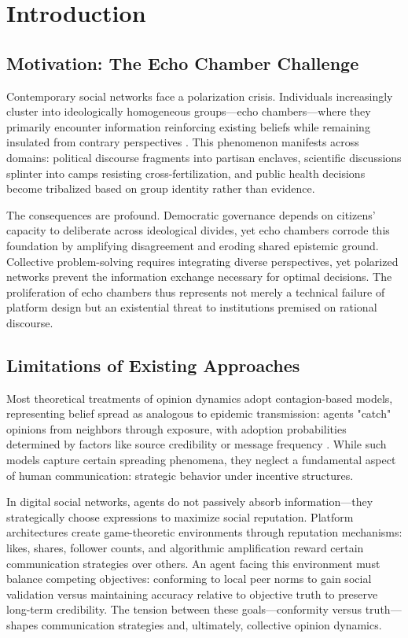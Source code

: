 \documentclass[11pt,a4paper]{article}
\begin{document}
\section{Introduction}

\subsection{Motivation: The Echo Chamber Challenge}

Contemporary social networks face a polarization crisis. Individuals increasingly cluster into ideologically homogeneous groups—echo chambers—where they primarily encounter information reinforcing existing beliefs while remaining insulated from contrary perspectives \cite{pariser2011filter, sunstein2001echo}. This phenomenon manifests across domains: political discourse fragments into partisan enclaves, scientific discussions splinter into camps resisting cross-fertilization, and public health decisions become tribalized based on group identity rather than evidence.

The consequences are profound. Democratic governance depends on citizens' capacity to deliberate across ideological divides, yet echo chambers corrode this foundation by amplifying disagreement and eroding shared epistemic ground. Collective problem-solving requires integrating diverse perspectives, yet polarized networks prevent the information exchange necessary for optimal decisions. The proliferation of echo chambers thus represents not merely a technical failure of platform design but an existential threat to institutions premised on rational discourse.

\subsection{Limitations of Existing Approaches}

Most theoretical treatments of opinion dynamics adopt contagion-based models, representing belief spread as analogous to epidemic transmission: agents "catch" opinions from neighbors through exposure, with adoption probabilities determined by factors like source credibility or message frequency \cite{castellano2009statistical}. While such models capture certain spreading phenomena, they neglect a fundamental aspect of human communication: strategic behavior under incentive structures.

In digital social networks, agents do not passively absorb information—they strategically choose expressions to maximize social reputation. Platform architectures create game-theoretic environments through reputation mechanisms: likes, shares, follower counts, and algorithmic amplification reward certain communication strategies over others. An agent facing this environment must balance competing objectives: conforming to local peer norms to gain social validation versus maintaining accuracy relative to objective truth to preserve long-term credibility. The tension between these goals—conformity versus truth—shapes communication strategies and, ultimately, collective opinion dynamics.
\end{document}
